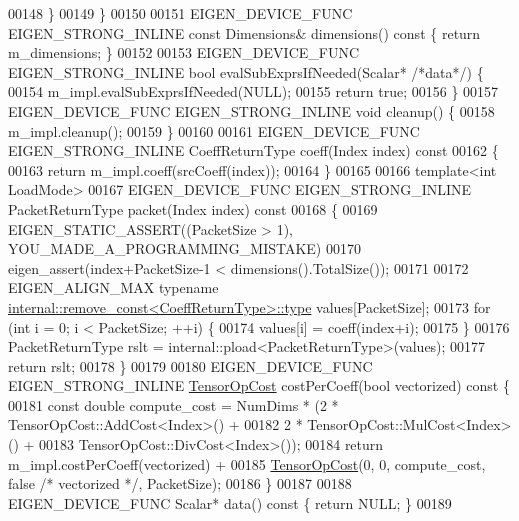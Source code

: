 \begin{DoxyCode}
00148     \}
00149   \}
00150 
00151   EIGEN\_DEVICE\_FUNC EIGEN\_STRONG\_INLINE \textcolor{keyword}{const} Dimensions& dimensions()\textcolor{keyword}{ const }\{ \textcolor{keywordflow}{return} m\_dimensions; \}
00152 
00153   EIGEN\_DEVICE\_FUNC EIGEN\_STRONG\_INLINE \textcolor{keywordtype}{bool} evalSubExprsIfNeeded(Scalar* \textcolor{comment}{/*data*/}) \{
00154     m\_impl.evalSubExprsIfNeeded(NULL);
00155     \textcolor{keywordflow}{return} \textcolor{keyword}{true};
00156   \}
00157   EIGEN\_DEVICE\_FUNC EIGEN\_STRONG\_INLINE \textcolor{keywordtype}{void} cleanup() \{
00158     m\_impl.cleanup();
00159   \}
00160 
00161   EIGEN\_DEVICE\_FUNC EIGEN\_STRONG\_INLINE CoeffReturnType coeff(Index index)\textcolor{keyword}{ const}
00162 \textcolor{keyword}{  }\{
00163     \textcolor{keywordflow}{return} m\_impl.coeff(srcCoeff(index));
00164   \}
00165 
00166   \textcolor{keyword}{template}<\textcolor{keywordtype}{int} LoadMode>
00167   EIGEN\_DEVICE\_FUNC EIGEN\_STRONG\_INLINE PacketReturnType packet(Index index)\textcolor{keyword}{ const}
00168 \textcolor{keyword}{  }\{
00169     EIGEN\_STATIC\_ASSERT((PacketSize > 1), YOU\_MADE\_A\_PROGRAMMING\_MISTAKE)
00170     eigen\_assert(index+PacketSize-1 < dimensions().TotalSize());
00171 
00172     EIGEN\_ALIGN\_MAX \textcolor{keyword}{typename} \hyperlink{group___sparse_core___module}{internal::remove\_const<CoeffReturnType>::type}
       values[PacketSize];
00173     \textcolor{keywordflow}{for} (\textcolor{keywordtype}{int} i = 0; i < PacketSize; ++i) \{
00174       values[i] = coeff(index+i);
00175     \}
00176     PacketReturnType rslt = internal::pload<PacketReturnType>(values);
00177     \textcolor{keywordflow}{return} rslt;
00178   \}
00179 
00180   EIGEN\_DEVICE\_FUNC EIGEN\_STRONG\_INLINE \hyperlink{class_eigen_1_1_tensor_op_cost}{TensorOpCost} costPerCoeff(\textcolor{keywordtype}{bool} vectorized)\textcolor{keyword}{ const }\{
00181     \textcolor{keyword}{const} \textcolor{keywordtype}{double} compute\_cost = NumDims * (2 * TensorOpCost::AddCost<Index>() +
00182                                            2 * TensorOpCost::MulCost<Index>() +
00183                                            TensorOpCost::DivCost<Index>());
00184     \textcolor{keywordflow}{return} m\_impl.costPerCoeff(vectorized) +
00185            \hyperlink{class_eigen_1_1_tensor_op_cost}{TensorOpCost}(0, 0, compute\_cost, \textcolor{keyword}{false} \textcolor{comment}{/* vectorized */}, PacketSize);
00186   \}
00187 
00188   EIGEN\_DEVICE\_FUNC Scalar* data()\textcolor{keyword}{ const }\{ \textcolor{keywordflow}{return} NULL; \}
00189 

\end{DoxyCode}
